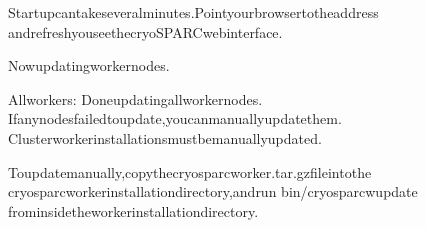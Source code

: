 \documentclass[a4paper,10pt,english]{sphinxmanual}
\begin{document}
\begin{sphinxVerbatim}[commandchars=\\\{\}]
Startupcantakeseveralminutes.Pointyourbrowsertotheaddress
andrefreshyouseethecryoSPARCwebinterface.

Nowupdatingworkernodes.

Allworkers:
\PYGZhy{}\PYGZhy{}\PYGZhy{}\PYGZhy{}\PYGZhy{}\PYGZhy{}\PYGZhy{}\PYGZhy{}\PYGZhy{}\PYGZhy{}\PYGZhy{}\PYGZhy{}\PYGZhy{}\PYGZhy{}\PYGZhy{}\PYGZhy{}\PYGZhy{}\PYGZhy{}\PYGZhy{}\PYGZhy{}\PYGZhy{}\PYGZhy{}\PYGZhy{}\PYGZhy{}\PYGZhy{}\PYGZhy{}\PYGZhy{}\PYGZhy{}\PYGZhy{}\PYGZhy{}\PYGZhy{}\PYGZhy{}\PYGZhy{}\PYGZhy{}\PYGZhy{}\PYGZhy{}\PYGZhy{}\PYGZhy{}\PYGZhy{}\PYGZhy{}\PYGZhy{}\PYGZhy{}\PYGZhy{}\PYGZhy{}\PYGZhy{}\PYGZhy{}\PYGZhy{}\PYGZhy{}\PYGZhy{}\PYGZhy{}\PYGZhy{}
Doneupdatingallworkernodes.
Ifanynodesfailedtoupdate,youcanmanuallyupdatethem.
Clusterworkerinstallationsmustbemanuallyupdated.

Toupdatemanually,copythecryosparc\PYGZus{}worker.tar.gzfileintothe
cryosparcworkerinstallationdirectory,andrun
\PYGZdl{}bin/cryosparcwupdate
frominsidetheworkerinstallationdirectory.
\end{sphinxVerbatim}
\end{document}
